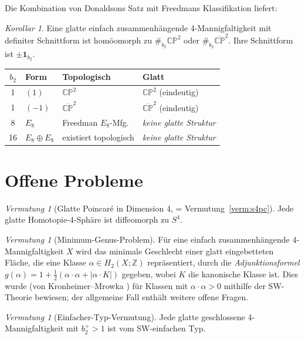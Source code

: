 \documentclass[12pt,a4paper]{amsart}
\theoremstyle{definition}
\theoremstyle{remark}
\newtheorem{korollar}[theorem]{Korollar}
\newtheorem{vermutung}[theorem]{Vermutung}
\newcommand{\CP}{\mathbb{CP}}
\newcommand{\ZZ}{\mathbb{Z}}
\begin{document}
Die Kombination von Donaldsons Satz mit Freedmans Klassifikation liefert:

\begin{korollar}
Eine glatte einfach zusammenhängende 4-Mannigfaltigkeit mit definiter
Schnittform ist homöomorph zu $\#_{b_2} \CP^2$ oder $\#_{b_2} \overline{\CP}^2$.
Ihre Schnittform ist $\pm \mathbf{1}_{b_2}$.
\end{korollar}

\begin{center}
\begin{tabular}{clll}
\toprule
$b_2$ & Form & Topologisch & Glatt \\
\midrule
1 & $(1)$ & $\CP^2$ & $\CP^2$ (eindeutig) \\
1 & $(-1)$ & $\overline{\CP}^2$ & $\overline{\CP}^2$ (eindeutig) \\
8 & $E_8$ & Freedman $E_8$-Mfg. & \emph{keine glatte Struktur} \\
16 & $E_8 \oplus E_8$ & existiert topologisch & \emph{keine glatte Struktur} \\
\bottomrule
\end{tabular}
\end{center}

\section{Offene Probleme}

\begin{vermutung}[Glatte Poincaré in Dimension 4, = Vermutung~\ref{verm:s4pc}]
Jede glatte Homotopie-4-Sphäre ist diffeomorph zu $S^4$.
\end{vermutung}

\begin{vermutung}[Minimum-Genus-Problem]
Für eine einfach zusammenhängende 4-Mannigfaltigkeit $X$ wird das minimale
Geschlecht einer glatt eingebetteten Fläche, die eine Klasse
$\alpha \in H_2(X;\ZZ)$ repräsentiert, durch die \emph{Adjunktionsformel}
$g(\alpha) = 1 + \tfrac{1}{2}(\alpha \cdot \alpha + |\alpha \cdot K|)$
gegeben, wobei $K$ die kanonische Klasse ist.  Dies wurde (von Kronheimer--Mrowka
\cite{KronheimerMrowka1994}) für Klassen mit $\alpha \cdot \alpha > 0$
mithilfe der SW-Theorie bewiesen; der allgemeine Fall enthält weitere offene
Fragen.
\end{vermutung}

\begin{vermutung}[Einfacher-Typ-Vermutung]
Jede glatte geschlossene 4-Mannigfaltigkeit mit $b_2^+ > 1$ ist vom
SW-einfachen Typ.
\end{vermutung}
\end{document}
